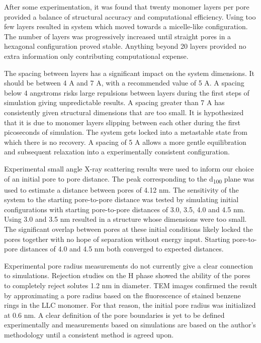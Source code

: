 \documentclass{article}
\begin{document}
	After some experimentation, it was found that twenty monomer layers per pore provided a balance of structural accuracy and computational efficiency. Using too few layers resulted in system which moved towards a micelle-like configuration. The number of layers was progressively increased until straight pores in a hexagonal configuration proved stable. Anything beyond 20 layers provided no extra information only contributing computational expense.  
	
	The spacing between layers has a significant impact on the system dimensions. It should be between 4 A and 7 A, with a recommended value of 5 A. A spacing below 4 angstroms risks large repulsions between layers during the first steps of simulation giving unpredictable results. A spacing greater than 7 A has consistently given structural dimensions that are too small. It is hypothesized that it is due to monomer layers slipping between each other during the first picoseconds of simulation. The system gets locked into a metastable state from which there is no recovery. A spacing of 5 A allows a more gentle equilibration and subsequent relaxation into a experimentally consistent configuration.   
	
	Experimental small angle X-ray scattering results were used to inform our choice of an initial pore to pore distance. The peak corresponding to the d\textsubscript{100} plane was used to estimate a distance between pores of 4.12 nm. The sensitivity of the system to the starting pore-to-pore distance was tested by simulating initial configurations with starting pore-to-pore distances of 3.0, 3.5, 4.0 and 4.5 nm. Using 3.0 and 3.5 nm resulted in a structure whose dimensions were too small. The significant overlap between pores at these initial conditions likely locked the pores together with no hope of separation without energy input. Starting pore-to-pore distances of 4.0 and 4.5 nm both converged to expected distances.

	Experimental pore radius measurements do not currently give a clear connection to simulations. Rejection studies on the H phase showed the ability of the pores to completely reject solutes 1.2 nm in diameter. TEM images confirmed the result by approximating a pore radius based on the fluorescence of stained benzene rings in the LLC monomer. For that reason, the initial pore radius was initialized at 0.6 nm. A clear definition of the pore boundaries is yet to be defined experimentally and measurements based on simulations are based on the author's methodology until a consistent method is agreed upon.     
\end{document}
